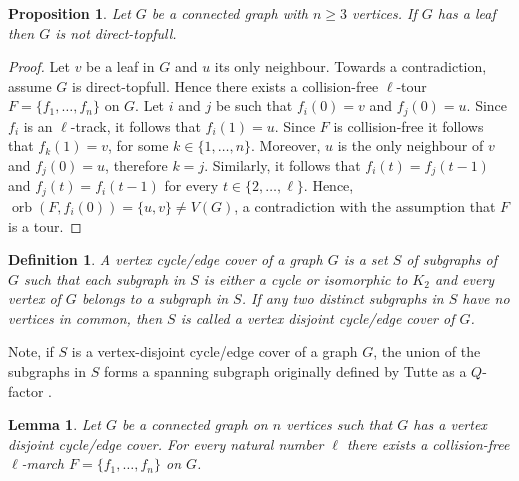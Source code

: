 \documentclass{article}
\newtheorem{definition}[theorem]{Definition}
\newtheorem{lemma}[theorem]{Lemma}
\newtheorem{proposition}[theorem]{Proposition}
\DeclareMathOperator{\orb}{\mathrm{orb}}
\begin{document}
\begin{proposition}
    Let $G$ be a connected graph with $n\geq 3$ vertices. If $G$ has a leaf then $G$ is not direct-topfull. 
\end{proposition}
\begin{proof}
    Let $v$ be a leaf in $G$ and $u$ its only neighbour. Towards a contradiction, assume $G$ is direct-topfull. Hence there exists a collision-free $\ell$-tour $F=\{f_1,\ldots,f_n\}$ on $G$. Let $i$ and $j$ be such that $f_i(0)=v$ and $f_j(0)=u$. Since $f_i$ is an $\ell$-track, it follows that $f_i(1)=u$. Since $F$ is collision-free it follows that $f_k(1)=v$, for some $k\in\{1,\ldots,n\}$. Moreover, $u$ is the only neighbour of $v$ and $f_j(0)=u$, therefore $k=j$. Similarly, it follows that $f_i(t) = f_j(t-1)$ and $f_j(t) = f_i(t-1)$ for every $t\in\{2,\ldots, \ell\}$. Hence, $\orb(F,f_i(0))=\{u,v\}\not= V(G)$, a contradiction with the assumption that $F$ is a tour.
\end{proof}

\begin{definition}
A vertex cycle/edge cover of a graph $G$ is a set $S$ of subgraphs of $G$ such that each subgraph in $S$ is either a cycle or isomorphic to $K_2$ and every vertex of $G$ belongs to a subgraph in $S$. If any two distinct subgraphs in $S$ have no vertices in common, then $S$ is called a vertex disjoint cycle/edge cover of $G$. 
\end{definition}

Note, if $S$ is a vertex-disjoint cycle/edge cover of a graph $G$, the union of the subgraphs in $S$ forms a spanning subgraph originally defined by Tutte as a $Q$-factor \cite{tutte1953}. 

\begin{lemma}\label{lem:cover-track}
Let $G$ be a connected graph on $n$ vertices such that $G$ has a vertex disjoint cycle/edge cover. For every natural number $\ell$ there exists a collision-free $\ell$-march $F=\{f_1, \ldots, f_n\}$ on $G$.
\end{lemma}
\end{document}

